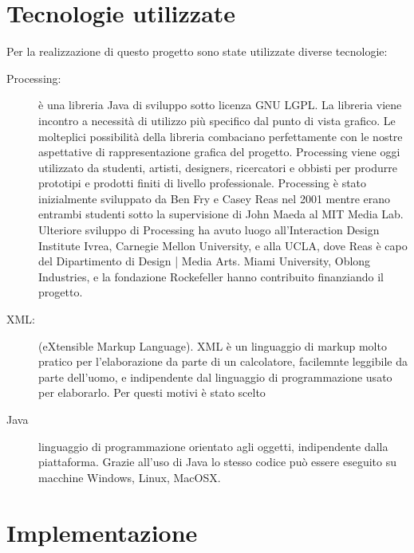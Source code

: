 \documentclass[a4paper,12pt]{article}
\begin{document}
\section{Tecnologie utilizzate}
Per la realizzazione di questo progetto sono state utilizzate diverse tecnologie:
\begin{description}
 \item[Processing:] \`e una libreria Java di sviluppo sotto licenza GNU LGPL. La libreria viene incontro a necessità di utilizzo più specifico dal punto di vista grafico. Le molteplici possibilità della libreria combaciano perfettamente con le nostre aspettative di rappresentazione grafica del progetto. Processing viene oggi utilizzato da studenti, artisti, designers, ricercatori e obbisti per produrre prototipi e prodotti finiti di livello professionale. Processing \`e stato inizialmente sviluppato da Ben Fry e Casey Reas nel 2001 mentre erano entrambi studenti sotto la supervisione di John Maeda al MIT Media Lab. Ulteriore sviluppo di Processing ha avuto luogo all'Interaction Design Institute Ivrea, Carnegie Mellon University, e alla UCLA, dove Reas \`e capo del Dipartimento di Design | Media Arts. Miami University, Oblong Industries, e la fondazione Rockefeller hanno contribuito finanziando il progetto.
 \item[XML:] (eXtensible Markup Language). XML \`e un linguaggio di markup molto pratico per l'elaborazione da parte di un calcolatore, facilemnte leggibile da parte dell'uomo, e indipendente dal linguaggio di programmazione usato per elaborarlo. Per questi motivi \`e stato scelto
 \item[Java] linguaggio di programmazione orientato agli oggetti, indipendente dalla piattaforma. Grazie all'uso di Java lo stesso codice pu\`o essere eseguito su macchine Windows, Linux, MacOSX.
\end{description}
        
\section{Implementazione}
\end{document}
